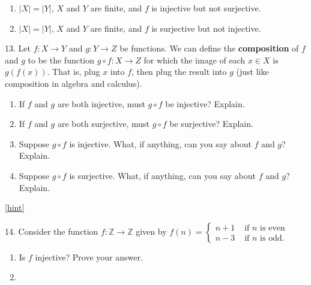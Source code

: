 \documentclass[10pt,]{book}
\newcommand{\terminology}[1]{\textbf{#1}}
\theoremstyle{plain}
\theoremstyle{definition}
\theoremstyle{definition}
\theoremstyle{definition}
\numberwithin{equation}{chapter}
\def\Z{\mathbb Z}
\newcommand{\amp}{&}
\begin{document}
\begin{exerciselist}
\begin{enumerate}[label=(\alph*)]
\item\hypertarget{li-456}{}\(|X| = |Y|\), \(X\) and \(Y\) are finite, and \(f\) is injective but not surjective.%
\item\hypertarget{li-457}{}\(|X| = |Y|\), \(X\) and \(Y\) are finite, and \(f\) is surjective but not injective.%
\end{enumerate}
%
\par\smallskip
\item[13.]\hypertarget{exercise-94}{}\hypertarget{p-2249}{}%
Let \(f:X \to Y\) and \(g:Y \to Z\) be functions.  We can define the \terminology{composition} of \(f\) and \(g\) to be the function \(g\circ f:X \to Z\) for which the image of each \(x \in X\) is \(g(f(x))\).  That is, plug \(x\) into \(f\), then plug the result into \(g\) (just like composition in algebra and calculus).%
\par
\hypertarget{p-2250}{}%
\leavevmode%
\begin{enumerate}[label=(\alph*)]
\item\hypertarget{li-464}{}\hypertarget{p-2251}{}%
If \(f\) and \(g\) are both injective, must \(g\circ f\) be injective?  Explain.%
\item\hypertarget{li-465}{}\hypertarget{p-2252}{}%
If \(f\) and \(g\) are both surjective, must \(g\circ f\) be surjective?  Explain.%
\item\hypertarget{li-466}{}\hypertarget{p-2253}{}%
Suppose \(g\circ f\) is injective.  What, if anything, can you say about \(f\) and \(g\)?  Explain.%
\item\hypertarget{li-467}{}\hypertarget{p-2254}{}%
Suppose \(g\circ f\) is surjective.  What, if anything, can you say about \(f\) and \(g\)?  Explain.%
\end{enumerate}
%
\par\smallskip
\hfill{\tiny\hyperlink{a-B.3.13}{[hint]}\hypertarget{q-B.3.13}{}}\item[14.]\hypertarget{exercise-95}{}\hypertarget{p-2261}{}%
Consider the function \(f:\Z \to \Z\) given by \(f(n) = \begin{cases}n+1 \amp  \text{ if }n\text{ is even} \\ n-3 \amp \text{ if }n\text{ is odd} . \end{cases}\) \leavevmode%
\begin{enumerate}[label=(\alph*)]
\item\hypertarget{li-472}{}\hypertarget{p-2262}{}%
Is \(f\) injective? Prove your answer.%
\item\hypertarget{li-473}{}\hypertarget{p-2263}{}%

\end{enumerate}
\end{exerciselist}
\end{document}
